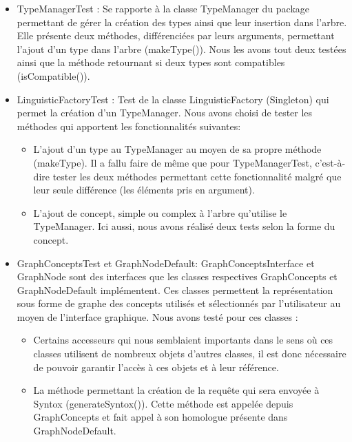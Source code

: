 \documentclass[12pt]{report}
\begin{document}
\begin{itemize}
\begin{itemize}
	\end{itemize}
\item TypeManagerTest : Se rapporte à la classe TypeManager du package permettant de gérer la création des types ainsi que leur insertion dans l'arbre. 
Elle présente deux méthodes, différenciées par leurs arguments, permettant l'ajout d'un type dans l'arbre (makeType()). Nous les avons tout deux testées ainsi que la méthode retournant si deux types sont compatibles (isCompatible()).
\item LinguisticFactoryTest : Test de la classe LinguisticFactory (Singleton) qui permet la création d'un TypeManager. 
Nous avons choisi de tester les méthodes qui apportent les fonctionnalités suivantes: 
	\begin{itemize}
	\item L'ajout d'un type au TypeManager au moyen de sa propre méthode (makeType). Il a fallu faire de même que pour TypeManagerTest, c'est-à-dire tester les deux méthodes permettant cette fonctionnalité malgré que leur seule différence (les éléments pris en argument). 
	\item L'ajout de concept, simple ou complex à l'arbre qu'utilise le TypeManager. Ici aussi, nous avons réalisé deux tests selon la forme du concept. 
	\end{itemize}
\item GraphConceptsTest et GraphNodeDefault: GraphConceptsInterface et GraphNode sont des interfaces que les classes respectives GraphConcepts et GraphNodeDefault implémentent.
Ces classes permettent la représentation sous forme de graphe des concepts utilisés et sélectionnés par l'utilisateur au moyen de l'interface graphique. 
Nous avons testé pour ces classes :
	\begin{itemize}
	\item Certains accesseurs qui nous semblaient importants dans le sens où ces classes utilisent de nombreux objets d'autres classes, il est donc nécessaire de pouvoir garantir l'accès à ces objets et à leur référence. 
	\item La méthode permettant la création de la requête qui sera envoyée à Syntox (generateSyntox()). Cette méthode est appelée depuis GraphConcepts et fait appel à son homologue présente dans GraphNodeDefault.
	\end{itemize}
\end{itemize}
\end{document}
